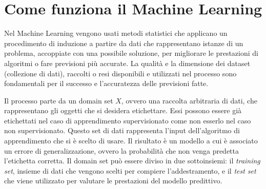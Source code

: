 \documentclass[12pt,italian]{report}
\begin{document}
\section{Come funziona il Machine Learning}
\label{ComefunzionailMachineLearning}
Nel Machine Learning vengono usati metodi statistici che applicano un procedimento di induzione a partire da dati che rappresentano istanze di un problema, accoppiate con una possibile soluzione, per migliorare le prestazioni di algoritmi o fare previsioni più accurate.
La qualità e la dimensione dei dataset (collezione di dati), raccolti o resi disponibili e utilizzati nel processo sono fondamentali per il successo e l'accuratezza delle previsioni fatte.

Il processo parte da un domain set $X$, ovvero una raccolta arbitraria di dati, che rappresentano gli oggetti che si desidera etichettare. Essi possono essere già etichettati nel caso di apprendimento supervisionato come non esserlo nel caso non supervisionato. Questo set di dati rappresenta l'input dell'algoritmo di apprendimento che si è scelto di usare. Il risultato è un modello a cui è associato un errore di generalizzazione, ovvero la probabilità che non venga predetta l'etichetta corretta.
Il domain set può essere diviso in due sottoinsiemi: il \textit{training set}, insieme di dati che vengono scelti per compiere l'addestramento, e il \textit{test set} che viene utilizzato per valutare le prestazioni del modello predittivo.
\end{document}
